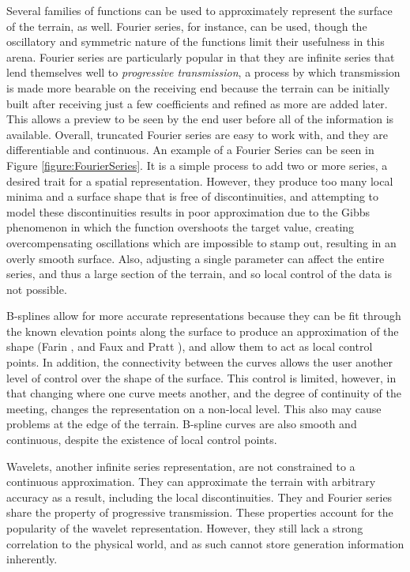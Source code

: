 Several families of functions can be used to approximately represent the surface of the terrain, as well. Fourier series, for instance, can be used, though the oscillatory and symmetric nature of the functions limit their usefulness in this arena. 
Fourier series are particularly popular in that they are infinite series that lend themselves well to \emph{progressive transmission}, a process by which transmission is made more bearable on the receiving end because the terrain can be initially built after receiving just a few coefficients and refined as more are added later. This allows a preview to be seen by the end user before all of the information is available.
Overall, truncated Fourier series are easy to work with, and they are differentiable and continuous. An example of a Fourier Series can be seen in Figure \ref{figure:FourierSeries}.
It is a simple process to add two or more series, a desired trait for a spatial representation. However, they produce too many local minima and a surface shape that is free of discontinuities, and attempting to model these discontinuities results in poor approximation due to the Gibbs phenomenon in which the function overshoots the target value, creating overcompensating oscillations which are impossible to stamp out, resulting in an overly smooth surface. Also, adjusting a single parameter can affect the entire series, and thus a large section of the terrain, and so local control of the data is not possible. 

B-splines allow for more accurate representations because they can be fit through the known elevation points along the surface to produce an approximation of the shape (Farin \cite{Farin:2001:CSC:501891}, and Faux and Pratt \cite{Faux:1979:CGD:578513}), and allow them to act as local control points. In addition, the connectivity between the curves allows the user another level of control over the shape of the surface. This control is limited, however, in that changing where one curve meets another, and the degree of continuity of the meeting, changes the representation on a non-local level. This also may cause problems at the edge of the terrain. B-spline curves are also smooth and continuous, despite the existence of local control points.

Wavelets, another infinite series representation, are not constrained to a continuous approximation. They can approximate the terrain with arbitrary accuracy as a result, including the local discontinuities. They and Fourier series share the property of progressive transmission. These properties account for the popularity of the wavelet representation. However, they still lack a strong correlation to the physical world, and as such cannot store generation information inherently. 

